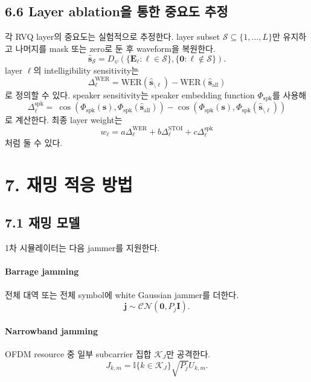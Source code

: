 \documentclass[11pt,a4paper]{article}
\begin{document}
\subsection{6.6 Layer ablation을 통한 중요도 추정}
각 RVQ layer의 중요도는 실험적으로 추정한다. layer subset $\mathcal{S}\subseteq\{1,\ldots,L\}$만 유지하고 나머지를 mask 또는 zero로 둔 후 waveform을 복원한다.
\begin{equation}
    \hat{\bm{s}}_{\mathcal{S}} = D_{\psi}\left(\{\bm{E}_{\ell}:\ell\in\mathcal{S}\},\{\bm{0}:\ell\notin\mathcal{S}\}\right).
\end{equation}
layer $\ell$의 intelligibility sensitivity는
\begin{equation}
    \Delta_{\ell}^{\mathrm{WER}}=\mathrm{WER}(\hat{\bm{s}}_{\setminus \ell})-\mathrm{WER}(\hat{\bm{s}}_{\mathrm{all}})
\end{equation}
로 정의할 수 있다. speaker sensitivity는 speaker embedding function $\Phi_{\mathrm{spk}}$를 사용해
\begin{equation}
    \Delta_{\ell}^{\mathrm{spk}}=\
    \cos\left(\Phi_{\mathrm{spk}}(\bm{s}),\Phi_{\mathrm{spk}}(\hat{\bm{s}}_{\mathrm{all}})\right)
    -
    \cos\left(\Phi_{\mathrm{spk}}(\bm{s}),\Phi_{\mathrm{spk}}(\hat{\bm{s}}_{\setminus \ell})\right)
\end{equation}
로 계산한다. 최종 layer weight는
\begin{equation}
    w_{\ell}=a\Delta_{\ell}^{\mathrm{WER}}+b\Delta_{\ell}^{\mathrm{STOI}}+c\Delta_{\ell}^{\mathrm{spk}}
\end{equation}
처럼 둘 수 있다.

\section{7. 재밍 적응 방법}

\subsection{7.1 재밍 모델}
1차 시뮬레이터는 다음 jammer를 지원한다.

\paragraph{Barrage jamming}
전체 대역 또는 전체 symbol에 white Gaussian jammer를 더한다.
\begin{equation}
    \bm{j}\sim\mathcal{CN}(\bm{0},P_j\bm{I}).
\end{equation}

\paragraph{Narrowband jamming}
OFDM resource 중 일부 subcarrier 집합 $\mathcal{K}_J$만 공격한다.
\begin{equation}
    J_{k,m}=\mathbb{I}\{k\in\mathcal{K}_J\}\sqrt{P_j}U_{k,m}.
\end{equation}
\end{document}
